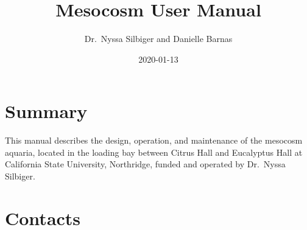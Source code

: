 \documentclass[]{book}
\title{Mesocosm User Manual}
\author{Dr.~Nyssa Silbiger and Danielle Barnas}
\date{2020-01-13}
\begin{document}
\maketitle

{
\setcounter{tocdepth}{1}
\tableofcontents
}
\chapter{Summary}\label{summary}

This manual describes the design, operation, and maintenance of the
mesocosm aquaria, located in the loading bay between Citrus Hall and
Eucalyptus Hall at California State University, Northridge, funded and
operated by Dr.~Nyssa Silbiger.

\chapter{Contacts}\label{contacts}
\end{document}

